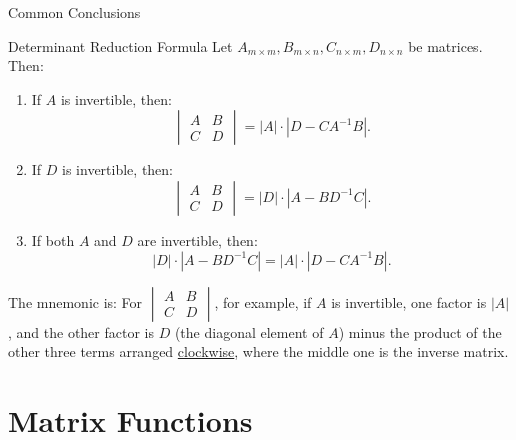 \documentclass[11pt]{../../TexTemplate/elegantbook} %
\begin{document}
\begin{leftbarTitle}{Common Conclusions}\end{leftbarTitle}
\begin{theorem}{Determinant Reduction Formula}\label{thm:determinant_reduction_formula}
    Let \(A_{m\times m}, B_{m\times n}, C_{n\times m}, D_{n\times n}\) be matrices. Then:
    \begin{enumerate}
        \item If \( A \) is invertible, then:
            \[
            \begin{vmatrix}
            A & B \\
            C & D
            \end{vmatrix}
            = |A| \cdot |D - CA^{-1}B|.
            \]
        \item If \( D \) is invertible, then:
            \[
            \begin{vmatrix}
            A & B \\
            C & D
            \end{vmatrix}
            = |D| \cdot |A - BD^{-1}C|.
            \]
        \item If both \( A \) and \( D \) are invertible, then:
            \[
            |D| \cdot |A - BD^{-1}C| = |A| \cdot |D - CA^{-1}B|.
            \]
    \end{enumerate}
\end{theorem}

\begin{remark}
    The mnemonic is: 
    For \( \begin{vmatrix} A & B \\ C & D \end{vmatrix} \), for example, if \( A \) is invertible, 
    one factor is \( |A| \), and the other factor is \( D \) (the diagonal element of \( A \)) minus 
    the product of the other three terms arranged \underline{clockwise}, where the middle one is the inverse matrix.
\end{remark}


\section{Matrix Functions}
\end{document}
